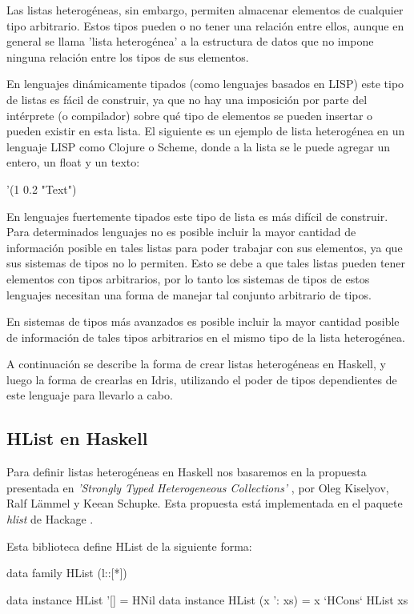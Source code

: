 Las listas heterogéneas, sin embargo, permiten almacenar elementos de cualquier tipo arbitrario. Estos tipos pueden o no tener una relación entre ellos, aunque en general se llama 'lista heterogénea' a la estructura de datos que no impone ninguna relación entre los tipos de sus elementos.

En lenguajes dinámicamente tipados (como lenguajes basados en LISP) este tipo de listas es fácil de construir, ya que no hay una imposición por parte del intérprete (o compilador) sobre qué tipo de elementos se pueden insertar o pueden existir en esta lista. El siguiente es un ejemplo de lista heterogénea en un lenguaje LISP como Clojure o Scheme, donde a la lista se le puede agregar un entero, un float y un texto:

\begin{code}
'(1 0.2 "Text")
\end{code}

En lenguajes fuertemente tipados este tipo de lista es más difícil de construir. Para determinados lenguajes no es posible incluir la mayor cantidad de información posible en tales listas para poder trabajar con sus elementos, ya que sus sistemas de tipos no lo permiten. Esto se debe a que tales listas pueden tener elementos con tipos arbitrarios, por lo tanto los sistemas de tipos de estos lenguajes necesitan una forma de manejar tal conjunto arbitrario de tipos.

En sistemas de tipos más avanzados es posible incluir la mayor cantidad posible de información de tales tipos arbitrarios en el mismo tipo de la lista heterogénea.

A continuación se describe la forma de crear listas heterogéneas en Haskell, y luego la forma de crearlas en Idris, utilizando el poder de tipos dependientes de este lenguaje para llevarlo a cabo.

\subsection{HList en Haskell}

Para definir listas heterogéneas en Haskell nos basaremos en la propuesta presentada en \textit{'Strongly Typed Heterogeneous Collections'} \cite{Kiselyov:2004:STH:1017472.1017488}, por Oleg Kiselyov, Ralf L\"{a}mmel y Keean Schupke. Esta propuesta está implementada en el paquete \textit{hlist} de Hackage \cite{HListHackage}.

Esta biblioteca define HList de la siguiente forma:

\begin{code}
data family HList (l::[*])

data instance HList '[] = HNil
data instance HList (x ': xs) = x `HCons` HList xs
\end{code}

